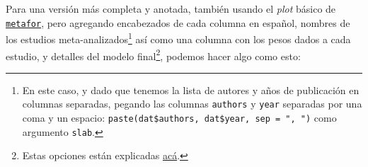 \documentclass[
  bookmarksnumbered]{article}
\newenvironment{Shaded}{\begin{snugshade}}{\end{snugshade}}
\newcommand{\AttributeTok}[1]{\textcolor[rgb]{0.00,0.34,0.68}{#1}}
\newcommand{\CommentTok}[1]{\textcolor[rgb]{0.54,0.53,0.53}{#1}}
\newcommand{\ConstantTok}[1]{\textcolor[rgb]{0.67,0.33,0.00}{#1}}
\newcommand{\DecValTok}[1]{\textcolor[rgb]{0.69,0.50,0.00}{#1}}
\newcommand{\FloatTok}[1]{\textcolor[rgb]{0.69,0.50,0.00}{#1}}
\newcommand{\FunctionTok}[1]{\textcolor[rgb]{0.39,0.29,0.61}{#1}}
\newcommand{\NormalTok}[1]{\textcolor[rgb]{0.12,0.11,0.11}{#1}}
\newcommand{\SpecialCharTok}[1]{\textcolor[rgb]{0.24,0.68,0.91}{#1}}
\newcommand{\StringTok}[1]{\textcolor[rgb]{0.75,0.01,0.01}{#1}}
\begin{document}
Para una versión más completa y anotada, también usando el \emph{plot} básico de \href{https://www.metafor-project.org/doku.php}{\texttt{metafor}}, pero agregando encabezados de cada columna en español, nombres de los estudios meta-analizados\footnote{En este caso, y dado que tenemos la lista de autores y años de publicación en columnas separadas, pegando las columnas \texttt{authors} y \texttt{year} separadas por una coma y un espacio: \texttt{paste(dat\$authors,\ dat\$year,\ sep\ =\ ",\ ")} como argumento \texttt{slab}.} así como una columna con los pesos dados a cada estudio, y detalles del modelo final\footnote{Estas opciones están explicadas \href{https://search.r-project.org/CRAN/refmans/metafor/html/forest.rma.html}{acá}.}, podemos hacer algo como esto:

\begin{Shaded}
\end{Shaded}
\end{document}
